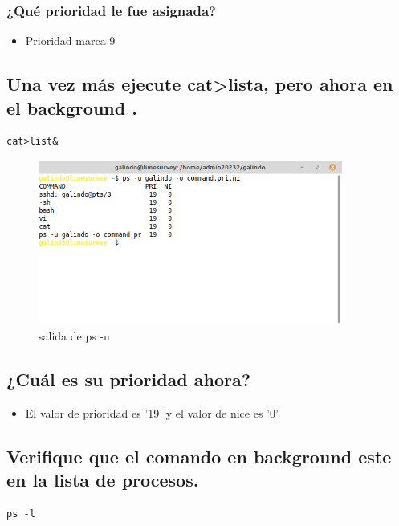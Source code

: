 \documentclass[11pt]{article}
\begin{document}
\subsubsection*{¿Qué prioridad le fue asignada?}
\label{sec:org7739010}
\begin{itemize}
\item Prioridad marca 9
\end{itemize}

\pagebreak

\subsection{Una vez más ejecute cat>lista, pero ahora en el background .}
\label{sec:orgf24ec62}
\begin{verbatim}
cat>list&
\end{verbatim}

\begin{figure}[htbp]
\centering
\includegraphics[width=10cm]{img/prioridad1.png}
\caption{salida de ps -u}
\end{figure}

\subsection{¿Cuál es su prioridad ahora?}
\label{sec:org505c7c8}
\begin{itemize}
\item El valor de prioridad es '19' y el valor de nice es '0'
\end{itemize}

\subsection{Verifique que el comando en background este en la lista de procesos.}
\label{sec:org99c47a9}
\begin{verbatim}
ps -l
\end{verbatim}
\end{document}
